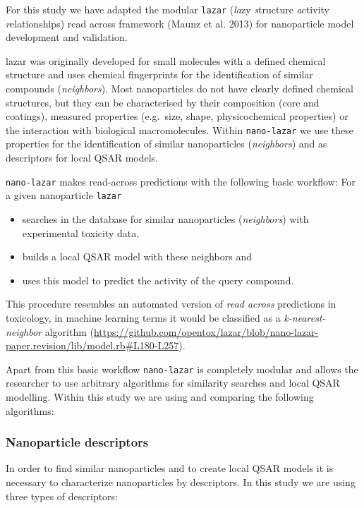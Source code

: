 \documentclass[utf8]{frontiersHLTH} %
\providecommand{\tightlist}{%
  \setlength{\itemsep}{0pt}\setlength{\parskip}{0pt}}
\begin{document}
For this study we have adapted the modular \texttt{lazar} (\emph{la}zy
\emph{s}tructure \emph{a}ctivity \emph{r}elationships) read across
framework (Maunz et al. 2013) for nanoparticle model development and
validation.

lazar was originally developed for small molecules with a defined
chemical structure and uses chemical fingerprints for the identification
of similar compounds (\emph{neighbors}). Most nanoparticles do not have
clearly defined chemical structures, but they can be characterised by
their composition (core and coatings), measured properties (e.g.~size,
shape, physicochemical properties) or the interaction with biological
macromolecules. Within \texttt{nano-lazar} we use these properties for
the identification of similar nanoparticles (\emph{neighbors}) and as
descriptors for local QSAR models.

\texttt{nano-lazar} makes read-across predictions with the following
basic workflow: For a given nanoparticle \texttt{lazar}

\begin{itemize}
\tightlist
\item
  searches in the database for similar nanoparticles (\emph{neighbors})
  with experimental toxicity data,
\item
  builds a local QSAR model with these neighbors and
\item
  uses this model to predict the activity of the query compound.
\end{itemize}

This procedure resembles an automated version of \emph{read across}
predictions in toxicology, in machine learning terms it would be
classified as a \emph{k-nearest-neighbor} algorithm
(\url{https://github.com/opentox/lazar/blob/nano-lazar-paper.revision/lib/model.rb\#L180-L257}).

Apart from this basic workflow \texttt{nano-lazar} is completely modular
and allows the researcher to use arbitrary algorithms for similarity
searches and local QSAR modelling. Within this study we are using and
comparing the following algorithms:

\subsubsection{Nanoparticle descriptors}\label{nanoparticle-descriptors}

In order to find similar nanoparticles and to create local QSAR models
it is necessary to characterize nanoparticles by descriptors. In this
study we are using three types of descriptors:
\end{document}
